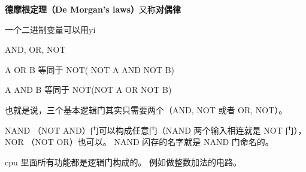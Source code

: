 
\begin{issues}
\issueDraft
\end{issues}

\textbf{德摩根定理（De Morgan's laws）}又称\textbf{对偶律}

一个二进制变量可以用yi

AND, OR, NOT

A OR B 等同于 NOT( NOT A AND NOT B)

A AND B 等同于 NOT(NOT A OR NOT B)

也就是说，三个基本逻辑门其实只需要两个（AND, NOT 或者 OR, NOT）。

NAND （NOT AND）门可以构成任意门（NAND 两个输入相连就是 NOT 门）， NOR （NOT OR）也可以。 NAND 闪存的名字就是 NAND 门命名的。

cpu 里面所有功能都是逻辑门构成的。 例如做整数加法的电路。
